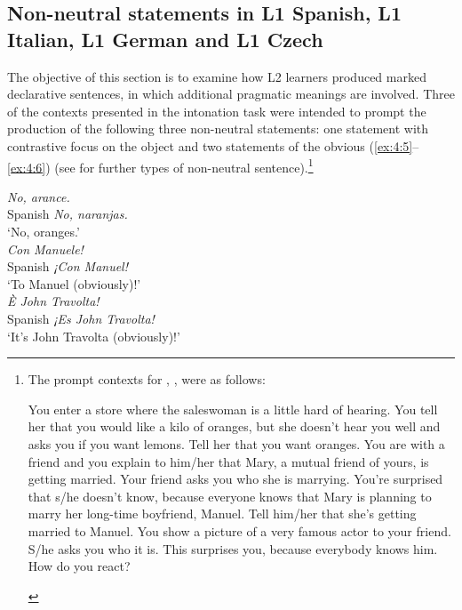 \subsection{Non-neutral statements in L1 Spanish, L1 Italian, L1 German and L1 Czech}\label{sec:4.2.1}
\begin{sloppypar}
The objective of this section is to examine how L2 learners produced marked declarative sentences, in which additional pragmatic meanings are involved. Three of the contexts presented in the intonation task were intended to prompt the production of the following three non-neutral statements: one statement with contrastive focus on the object  and two statements of the obvious (\ref{ex:4:5}--\ref{ex:4:6}) (see \citealt{Pešková2022b} for further types of non-neutral sentence).\footnote{The prompt contexts for , ,  were as follows:
\begin{exe}
 You enter a store where the saleswoman is a little hard of hearing. You tell her that you would like a kilo of oranges, but she doesn’t hear you well and asks you if you want lemons. Tell her that you want oranges.
 You are with a friend and you explain to him/her that Mary, a mutual friend of yours, is getting married. Your friend asks you who she is marrying. You're surprised that s/he doesn’t know, because everyone knows that Mary is planning to marry her long-time boyfriend, Manuel. Tell him/her that she’s getting married to Manuel.
 You show a picture of a very famous actor to your friend. S/he asks you who it is. This surprises you, because everybody knows him. How do you react?
\end{exe}}
\end{sloppypar}


\ea\label{ex:4:4}     \textit{No, arance.}\\
    Spanish   \textit{No, naranjas.}\\
    {}  {‘No, oranges.’}\\

\ex\label{ex:4:5}     \textit{Con Manuele!}\\
Spanish   \textit{¡Con Manuel!}\\
  {}    {‘To Manuel (obviously)!’}\\

\ex\label{ex:4:6}     \textit{È John Travolta!}\\
Spanish   \textit{¡Es John Travolta!}\\
{}      {‘It’s John Travolta (obviously)!’}\\
\z

